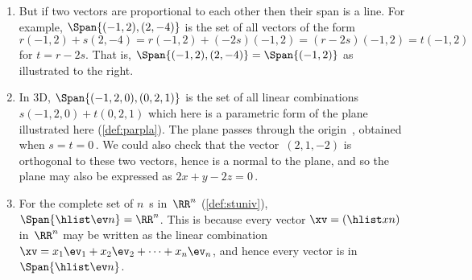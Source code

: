 \begin{example}
\begin{enumerate}
\item 
\begin{figbox}{}%
But if two vectors are proportional to each other then their span is a line. 
For example, \(\Span\{(-1,2),(2,-4)\}\) is the set of all vectors of the form \(r(-1,2)+s(2,-4)=r(-1,2)+(-2s)(-1,2)=(r-2s)(-1,2)=t(-1,2)\) for \(t=r-2s\).  
That is, \(\Span\{(-1,2),(2,-4)\}=\Span\{(-1,2)\}\) as illustrated to the right.
\end{figbox}

\item  
\begin{figbox}{ {}}%
In 3D, \(\Span\{(-1,2,0),(0,2,1)\}\) is the set of all linear combinations \(s(-1,2,0)+t(0,2,1)\) which here is a parametric form of the plane illustrated here (\cref{def:parpla}).  
The plane passes through the origin~\ov, obtained when \(s=t=0\)\,.
We could also check that the vector~\((2,1,-2)\) is orthogonal to these two vectors, hence is a normal to the plane, and so the plane may also be expressed as \(2x+y-2z=0\)\,.
\end{figbox}



\item For the complete set of \(n\)~s in~\(\RR^n\) (\cref{def:stuniv}), \(\Span\{\hlist\ev n\}=\RR^n\).
This is because every vector \(\xv=(\hlist xn)\) in~\(\RR^n\) may be written as the linear combination \(\xv=x_1\ev_1+x_2\ev_2+\cdots+x_n\ev_n\), and hence every vector is in \(\Span\{\hlist\ev n\}\).




\end{enumerate}
\end{example}
